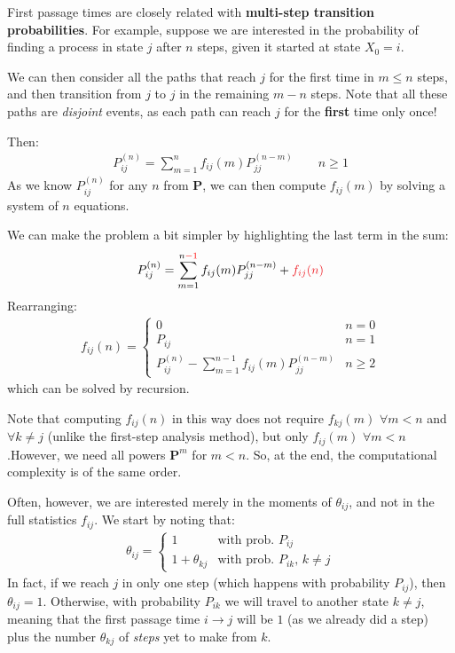 \documentclass[../template.tex]{subfiles}
\begin{document}
\medskip

First passage times are closely related with \textbf{multi-step transition probabilities}. For example, suppose we are interested in the probability of finding a process in state $j$ after $n$ steps, given it started at state $X_0 =i$.

We can then consider all the paths that reach $j$ for the first time in $m \leq n$ steps, and then transition from $j$ to $j$ in the remaining $m-n$ steps. Note that all these paths are \textit{disjoint} events, as each path can reach $j$ for the \textbf{first} time only once!

Then:
\begin{align*}
    P_{ij}^{(n)} = \sum_{m=1}^n f_{ij}(m) P_{jj}^{(n-m)} \qquad n \geq 1
\end{align*}
As we know $P_{ij}^{(n)}$ for any $n$ from \textbf{P}, we can then compute $f_{ij}(m)$ by solving a system of $n$ equations.

\medskip

We can make the problem a bit simpler by highlighting the last term in the sum:
\begin{align*}
    P_{ij}^{(n)} = \sum_{m=1}^{n\textcolor{red}{-1}} f_{ij}(m) P_{jj}^{(n-m)} + \textcolor{Red}{f_{ij}(n)}
\end{align*}
Rearranging:
\begin{align*}
    f_{ij}(n) = \begin{cases}
        0 & n = 0\\
        P_{ij} & n = 1\\
        P_{ij}^{(n)} - \sum_{m=1}^{n-1} f_{ij}(m) P_{jj}^{(n-m)} & n \geq 2
    \end{cases}
\end{align*}
which can be solved by recursion.

\medskip

Note that computing $f_{ij}(n)$ in this way does not require $f_{kj}(m)$ $\forall m < n$ and $\forall k \neq j$ (unlike the first-step analysis method), but only $f_{ij}(m)$ $\forall m < n$.However, we need all powers $\textbf{P}^m$ for $m < n$. So, at the end, the computational complexity is of the same order.  

\medskip

Often, however, we are interested merely in the moments of $\theta_{ij}$, and not in the full statistics $f_{ij}$. We start by noting that:
\begin{align}\label{eqn:theta-prob}
    \theta_{ij} = \begin{cases}
        1 & \text{with prob. $P_{ij}$}\\
        1+ \theta_{kj} & \text{with prob. $P_{ik}$, $k\neq j$}
    \end{cases}
\end{align}
In fact, if we reach $j$ in only one step (which happens with probability $P_{ij}$), then $\theta_{ij} = 1$. Otherwise, with probability $P_{ik}$ we will travel to another state $k \neq j$, meaning that the first passage time $i \to j$ will be $1$ (as we already did a step) plus the number $\theta_{kj}$ of \textit{steps} yet to make from $k$. 
\end{document}
